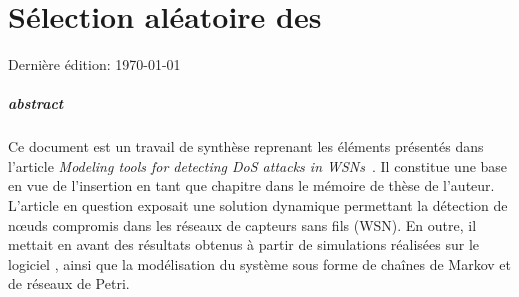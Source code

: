 \chapter{Sélection aléatoire des \cns}

\renewcommand\chapterpath{Main/SelecAleatoire}
\renewcommand\chapterfig{Main/SelecAleatoire/Figures}

Dernière édition: \today

\paragraph{abstract}
Ce document est un travail de synthèse reprenant les éléments présentés dans l'article \textit{Modeling tools for detecting DoS attacks in WSNs}~\cite{BMM13}.
Il constitue une base en vue de l'insertion en tant que chapitre dans le mémoire de thèse de l'auteur.\\

L'article en question exposait une solution dynamique permettant la détection de nœuds compromis dans les réseaux de capteurs sans fils (WSN).
En outre, il mettait en avant des résultats obtenus à partir de simulations réalisées sur le logiciel \ns, ainsi que la modélisation du système sous forme de chaînes de Markov et de réseaux de Petri.\\

